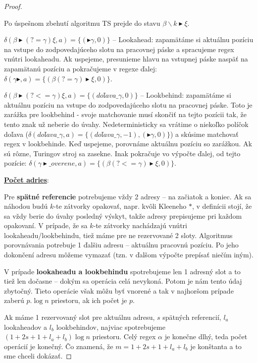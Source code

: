 \begin{proof}
\begin{list}{}{}
Po úspešnom zbehutí algoritmu TS prejde do stavu $\beta\backslash k \blacktriangleright\xi$.
\item $\delta(\beta\blacktriangleright(?=\gamma)\xi, a) = \lbrace (\blacktriangleright\gamma, 0) \rbrace$ -- Lookahead: zapamätáme si aktuálnu pozíciu na vstupe do zodpovedajúceho slotu na pracovnej páske a spracujeme regex vnútri lookaheadu. Ak uspejeme, presunieme hlavu na vstupnej páske naspäť na zapamätanú pozíciu a pokračujeme v regexe ďalej: $\delta(\gamma\blacktriangleright, a) = \lbrace (\beta(?=\gamma)\blacktriangleright\xi, 0) \rbrace $.
\item $\delta(\beta\blacktriangleright(?<=\gamma)\xi, a) = \lbrace (doľava\_ \gamma, 0) \rbrace$
-- Lookbehind: zapamätáme si aktuálnu pozíciu na vstupe do zodpovedajúceho slotu na pracovnej páske. Toto je zarážka pre lookbehind - svoje matchovanie musí skončiť na tejto pozícii tak, že tento znak už neberie do úvahy. Nedeterministicky sa vrátime o niekoľko políčok doľava ($\delta(doľava\_ \gamma, a) = \lbrace(doľava\_ \gamma,-1), (\blacktriangleright\gamma, 0)\rbrace$)  a skúsime matchovať regex v lookbehinde. Keď uspejeme, porovnáme aktuálnu pozíciu so zarážkou. Ak sú rôzne, Turingov stroj sa zasekne. Inak pokračuje vo výpočte ďalej, od tejto pozície: $\delta(\gamma\blacktriangleright\_overene, a) = \lbrace (\beta(?<=\gamma)\blacktriangleright\xi, 0) \rbrace $.
\end{list}

\textbf{\underline{Počet adries}}:

Pre \textbf{spätné referencie} potrebujeme vždy 2 adresy -- na začiatok a koniec. Ak sa náhodou budú $k$-te zátvorky opakovať, napr. kvôli Kleeneho $*$, v definícii stojí, že sa vždy berie do úvahy posledný výskyt, takže adresy prepisujeme pri každom opakovaní. V prípade, že sa $k$-te zátvorky nachádzajú vnútri lookaheadu/lookbehindu, tiež máme pre ne rezervované 2 sloty. Algoritmus porovnávania potrebuje 1 ďalšiu adresu -- aktuálnu pracovnú pozíciu. Po jeho dokončení adresu môžeme vymazať (tzn. v ďalšom výpočte prepísať niečím iným).

V prípade \textbf{lookaheadu a lookbehindu} spotrebujeme len 1 adresný slot a to tiež len dočasne -- dokým sa operácia celá nevykoná. Potom je nám tento údaj zbytočný. Tieto operácie však môžu byť vnorené a tak v najhoršom prípade zaberú $p.\log n$ priestoru, ak ich počet je $p$.

Ak máme 1 rezervovaný slot pre aktuálnu adresu, $s$ spätných referencií, $l_a$ lookaheadov a $l_b$ lookbehindov, najviac spotrebujeme $(1+2s+1+l_a+l_b)\log n$ priestoru. Celý regex $\alpha$ je konečne dlhý, teda počet operácií je konečný. Čo znamená, že $m=1+2s+1+l_a+l_b$ je konštanta a to sme chceli dokázať.

\end{proof}


